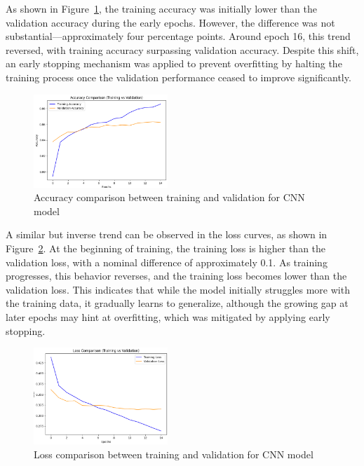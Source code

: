 As shown in Figure~\ref{fig:cnn_accuracy}, the training accuracy was initially lower than the validation accuracy during the early epochs. However, the difference was not substantial—approximately four percentage points. Around epoch 16, this trend reversed, with training accuracy surpassing validation accuracy. Despite this shift, an early stopping mechanism was applied to prevent overfitting by halting the training process once the validation performance ceased to improve significantly.

\begin{figure}[H]
    \centering
    \includegraphics[width=0.45\textwidth]{images/AccuracyComparisonCNN.png}
    \caption{Accuracy comparison between training and validation for CNN model}
    \label{fig:cnn_accuracy}
\end{figure}

A similar but inverse trend can be observed in the loss curves, as shown in Figure~\ref{fig:cnn_loss}. At the beginning of training, the training loss is higher than the validation loss, with a nominal difference of approximately 0.1. As training progresses, this behavior reverses, and the training loss becomes lower than the validation loss. This indicates that while the model initially struggles more with the training data, it gradually learns to generalize, although the growing gap at later epochs may hint at overfitting, which was mitigated by applying early stopping.

\begin{figure}[H]
    \centering
    \includegraphics[width=0.45\textwidth]{images/LossComparisonCNN.png}
    \caption{Loss comparison between training and validation for CNN model}
    \label{fig:cnn_loss}
\end{figure}


